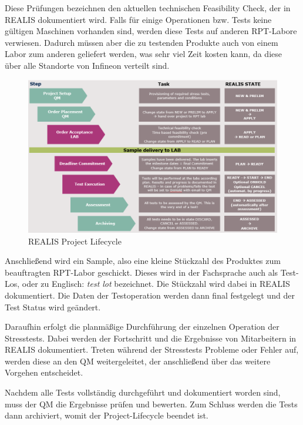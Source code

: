 Diese Prüfungen bezeichnen den aktuellen technischen Feasibility Check, der in \ac{REALIS} dokumentiert wird.
Falls für einige Operationen bzw. Tests keine gültigen Maschinen vorhanden sind, werden diese Tests auf anderen \ac{RPT}-Labore verwiesen. Dadurch müssen aber die zu testenden Produkte auch von einem Labor zum anderen geliefert werden, was sehr viel Zeit kosten kann, da diese über alle Standorte von Infineon verteilt sind.

\begin{figure}[!h]
    \centering
    \includegraphics[width=1\textwidth]{bilder/realis-project-lifecycle.png}
    \caption{REALIS Project Lifecycle}
    \label{fig:realis-project-lifecycle}
\end{figure}

Anschließend wird ein Sample, also eine kleine Stückzahl des Produktes zum beauftragten \ac{RPT}-Labor geschickt. Dieses wird in der Fachsprache auch als Test-Los, oder zu Englisch: \textit{test lot}
bezeichnet. Die Stückzahl wird dabei in \ac{REALIS} dokumentiert. Die  Daten der Testoperation werden dann final festgelegt und der Test Status wird geändert.

Daraufhin erfolgt die planmäßige Durchführung der einzelnen Operation der Stresstests. Dabei werden der Fortschritt und die Ergebnisse von Mitarbeitern in \ac{REALIS} dokumentiert. Treten während der Stresstests Probleme oder Fehler auf, werden diese an den \ac{QM} weitergeleitet, der anschließend über das weitere Vorgehen entscheidet.

Nachdem alle Tests vollständig durchgeführt und dokumentiert worden sind, muss der \ac{QM} die Ergebnisse prüfen und bewerten. Zum Schluss werden die Tests dann archiviert, womit der Project-Lifecycle beendet ist.

